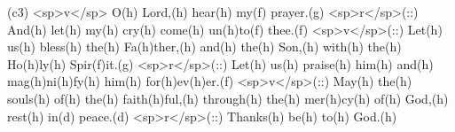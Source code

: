 (c3) <sp>v</sp> O(h) Lord,(h) hear(h) my(f) prayer.(g) <sp>r</sp>(::) And(h) let(h) my(h) cry(h) come(h) un(h)to(f) thee.(f) <sp>v</sp>(::) Let(h) us(h) bless(h) the(h) Fa(h)ther,(h) and(h) the(h) Son,(h) with(h) the(h) Ho(h)ly(h) Spir(f)it.(g) <sp>r</sp>(::) Let(h) us(h) praise(h) him(h) and(h) mag(h)ni(h)fy(h) him(h) for(h)ev(h)er.(f) <sp>v</sp>(::) May(h) the(h) souls(h) of(h) the(h) faith(h)ful,(h) through(h) the(h) mer(h)cy(h) of(h) God,(h) rest(h) in(d) peace.(d) <sp>r</sp>(::) Thanks(h) be(h) to(h) God.(h)